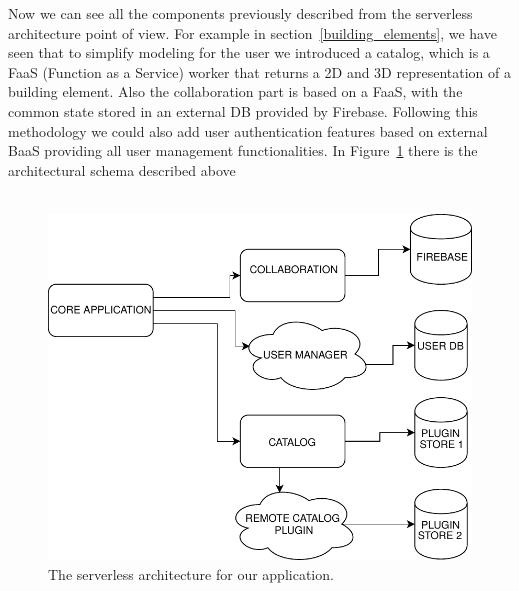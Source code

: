 Now we can see all the components previously described from the serverless architecture point of view. For example in section~\ref{building_elements}, we have seen that to simplify modeling for the user we introduced a catalog, which is a FaaS (Function as a Service) worker that returns a 2D and 3D representation of a building element. Also the collaboration part is based on a FaaS, with the common state stored in an external DB provided by Firebase. Following this methodology we could also add user authentication features based on external BaaS providing all user management functionalities. In Figure~\ref{fig_serverless} there is the architectural schema described above\\\\

\begin{figure}[htb]
\centering
\includegraphics[width=\linewidth]{contents/images/serverless-diagram}

\caption{The serverless architecture for our application.}
\label{fig_serverless}
\end{figure}